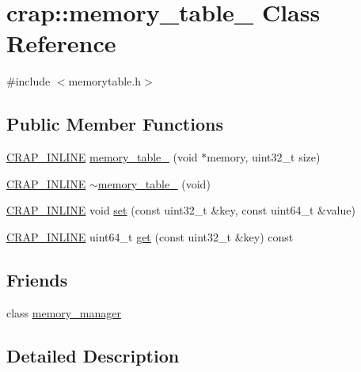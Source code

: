 \hypertarget{classcrap_1_1memory__table__64}{\section{crap\+:\+:memory\+\_\+table\+\_ Class Reference}
\label{classcrap_1_1memory__table__64}
}


{\ttfamily \#include $<$memorytable.\+h$>$}

\subsection*{Public Member Functions}
\begin{DoxyCompactItemize}
\item 
\hyperlink{config__x86_8h_a5a40526b8d842e7ff731509998bb0f1c}{C\+R\+A\+P\+\_\+\+I\+N\+L\+I\+N\+E} \hyperlink{classcrap_1_1memory__table__64_a8a0a19a50005a7d370e0f204f7da9581}{memory\+\_\+table\+\_} (void $\ast$memory, uint32\+\_\+t size)
\item 
\hyperlink{config__x86_8h_a5a40526b8d842e7ff731509998bb0f1c}{C\+R\+A\+P\+\_\+\+I\+N\+L\+I\+N\+E} \hyperlink{classcrap_1_1memory__table__64_a7703ea803271bdb8c93ac3a15857c20a}{$\sim$memory\+\_\+table\+\_} (void)
\item 
\hyperlink{config__x86_8h_a5a40526b8d842e7ff731509998bb0f1c}{C\+R\+A\+P\+\_\+\+I\+N\+L\+I\+N\+E} void \hyperlink{classcrap_1_1memory__table__64_aba67657c7f5255aa2dbf100ada039fc4}{set} (const uint32\+\_\+t \&key, const uint64\+\_\+t \&value)
\item 
\hyperlink{config__x86_8h_a5a40526b8d842e7ff731509998bb0f1c}{C\+R\+A\+P\+\_\+\+I\+N\+L\+I\+N\+E} uint64\+\_\+t \hyperlink{classcrap_1_1memory__table__64_ad963ac54fede72185c9d90f96ae522b1}{get} (const uint32\+\_\+t \&key) const 
\end{DoxyCompactItemize}
\subsection*{Friends}
\begin{DoxyCompactItemize}
\item 
class \hyperlink{classcrap_1_1memory__table__64_a242c93ac6853d673bc3e068a57510842}{memory\+\_\+manager}
\end{DoxyCompactItemize}


\subsection{Detailed Description}


